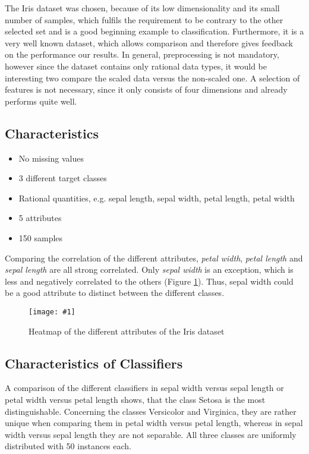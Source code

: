 \documentclass{article}
\newcommand{\size}{0.9\textwidth}
\newcommand{\image}[3]{
\begin{figure}
\begin{center}
\texttt{[image: \#1]}
\caption{#2}
#3
\end{center}
\end{figure}
}
\begin{document}
The Iris dataset was chosen, because of its low dimensionality and its small number of samples, which fulfils the requirement to be contrary to the other selected set and is a good beginning example to classification. Furthermore, it is a very well known dataset, which allows comparison and therefore gives feedback on the performance our results. In general, preprocessing is not mandatory, however since the dataset contains only rational data types, it would be interesting two compare the scaled data versus the non-scaled one. A selection of features is not necessary, since it only consists of four dimensions and already performs quite well.

\subsection{Characteristics}

\begin{itemize}
\item No missing values
\item 3 different target classes
\item Rational quantities, e.g. sepal length, sepal width, petal length, petal width
\item 5 attributes
\item 150 samples
\end{itemize}

Comparing the correlation of the different attributes, \textit{petal width}, \textit{petal length} and \textit{sepal length} are all strong correlated. Only \textit{sepal width} is an exception, which is less and negatively correlated to the others (Figure \ref{fig:heat}). Thus, sepal width could be a good attribute to distinct between the different classes.

\image{plots/heatmap.png}{Heatmap of the different attributes of the Iris dataset}{\label{fig:heat}}

\subsection{Characteristics of Classifiers}
A comparison of the different classifiers in sepal width versus sepal length or petal width versus petal length shows, that the class Setosa is the most distinguishable. Concerning the classes Versicolor and Virginica, they are rather unique when comparing them in petal width versus petal length, whereas in sepal width versus sepal length they are not separable. All three classes are uniformly distributed with 50 instances each.
\end{document}
